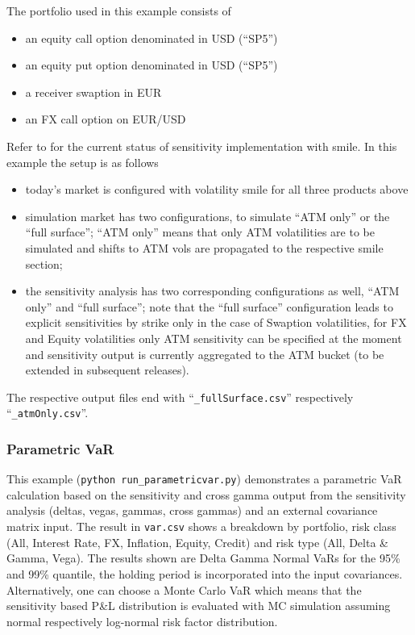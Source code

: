 \medskip
The portfolio used in this example consists of
\begin{itemize}
	\item an equity call option denominated in USD (``SP5'')
	\item an equity put option denominated in USD (``SP5'')
	\item a receiver swaption in EUR
	\item an FX call option on EUR/USD
\end{itemize}

\medskip
Refer to \cite{methods} for the current status of sensitivity implementation with smile.
In this example the setup is as follows
\begin{itemize}
\item today's market is configured with volatility smile for all three products above
\item simulation market has two configurations, to simulate ``ATM only'' or the ``full surface''; ``ATM only'' means that only ATM volatilities are to be simulated and shifts to ATM vols are propagated to the respective smile section;
\item the sensitivity analysis has two corresponding configurations as well, ``ATM only'' and ``full surface''; note that the ``full surface'' configuration leads to explicit sensitivities by strike only in the case of Swaption volatilities, for FX and Equity volatilities only ATM sensitivity can be specified at the moment and sensitivity output is currently aggregated to the ATM bucket (to be extended in subsequent releases).
\end{itemize}

The respective output files end with ``{\tt\_fullSurface.csv}'' respectively ``{\tt\_atmOnly.csv}''.

\subsubsection{Parametric VaR}
\label{example:marketrisk_parametricvar}

\medskip
This example ({\tt python run\_parametricvar.py}) demonstrates a parametric VaR calculation based on the sensitivity
and cross gamma output from the sensitivity analysis (deltas, vegas, gammas, cross gammas) and an
external covariance matrix input. The result in {\tt var.csv} shows a breakdown by portfolio, risk
class (All, Interest Rate, FX, Inflation, Equity, Credit) and risk type (All, Delta \& Gamma, Vega).
The results shown are Delta Gamma Normal VaRs for the 95\% and 99\% quantile, the holding period is
incorporated into the input covariances. Alternatively, one can choose a Monte Carlo VaR which means
that the sensitivity based P\&L distribution is evaluated with MC simulation assuming normal
respectively log-normal risk factor distribution. 


